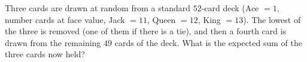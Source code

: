 Three cards are drawn at random from a standard $52$-card deck (Ace $=1$, number cards at face value, Jack $=11$, Queen $=12$, King $=13$). The lowest of the three is removed (one of them if there is a tie), and then a fourth card is drawn from the remaining $49$ cards of the deck. What is the expected sum of the three cards now held?
